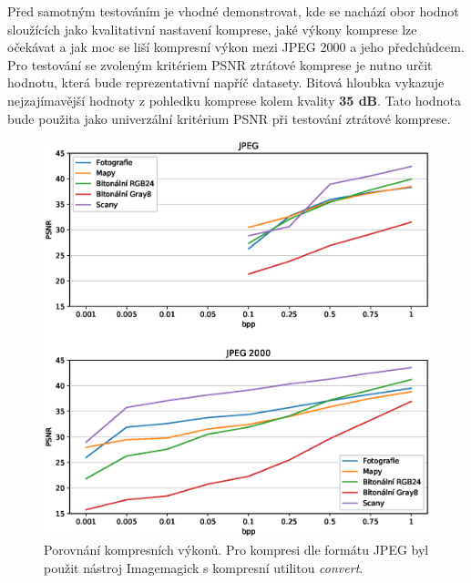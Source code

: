 %
%
Před samotným testováním je vhodné demonstrovat, kde se nachází obor hodnot sloužících jako kvalitativní nastavení komprese, jaké výkony komprese lze očekávat a jak moc se liší kompresní výkon mezi JPEG 2000 a jeho předchůdcem. Pro testování se zvoleným kritériem PSNR ztrátové komprese je nutno určit hodnotu, která bude reprezentativní napříč datasety. Bitová hloubka vykazuje nejzajímavější hodnoty z pohledku komprese kolem kvality \textbf{35 dB}. Tato hodnota bude použita jako univerzální kritérium PSNR při testování ztrátové komprese.
\begin{figure}[hbt!]
  \centering
  \hspace*{-0.5cm}
  \includegraphics[width=16cm]{obrazky-figures/porovnani.eps}
  \caption{Porovnání kompresních výkonů. Pro kompresi dle formátu JPEG byl použit nástroj Imagemagick s kompresní utilitou \textit{convert}.}
\end{figure}
\clearpage

